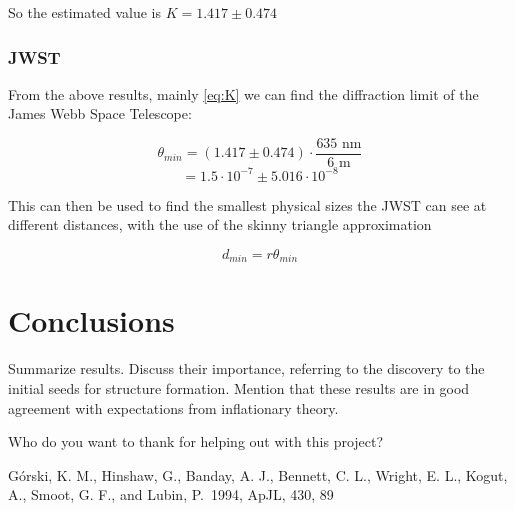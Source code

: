 \documentclass{emulateapj}
\begin{document}
So the estimated value is $K = 1.417 \pm 0.474$

\subsubsection{JWST}
From the above results, mainly \eqref{eq:K} we can find the diffraction limit of the James Webb Space Telescope:

\begin{equation}
\theta_{min} = (1.417 \pm 0.474) \cdot \frac{635 \text{ nm}}{6 \text{ m}}
\end{equation}
\begin{equation}
= 1.5\cdot 10^{-7} \pm 5.016\cdot 10^{-8}
\end{equation}\label{JWSTDiffLimit}

This can then be used to find the smallest physical sizes the JWST can see at different distances, with the use of the skinny triangle approximation

\begin{equation}
d_{min} = r\theta_{min}
\end{equation}

\section{Conclusions}
\label{sec:conclusions}

Summarize results. Discuss their importance, referring to the
discovery to the initial seeds for structure formation. Mention that
these results are in good agreement with expectations from
inflationary theory.



%
%


%



\begin{acknowledgements}
  Who do you want to thank for helping out with this project?
\end{acknowledgements}

\begin{thebibliography}{}

 G{\'o}rski, K. M.,
  Hinshaw, G., Banday, A. J., Bennett, C. L., Wright, E. L., Kogut,
  A., Smoot, G. F., and Lubin, P.\ 1994, ApJL, 430, 89

\end{thebibliography}
\end{document}
